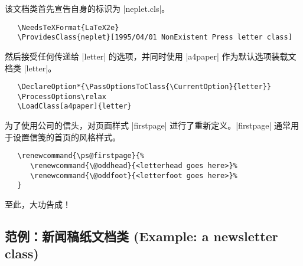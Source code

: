 \documentclass{ltxguide}[1995/11/28]
\begin{document}
该文档类首先宣告自身的标识为 |neplet.cls|。
\begin{verbatim}
   \NeedsTeXFormat{LaTeX2e}
   \ProvidesClass{neplet}[1995/04/01 NonExistent Press letter class]
\end{verbatim}
然后接受任何传递给 |letter| 的选项，并同时使用 |a4paper| 作为默认选项装载文档类 |letter|。
\begin{verbatim}
   \DeclareOption*{\PassOptionsToClass{\CurrentOption}{letter}}
   \ProcessOptions\relax
   \LoadClass[a4paper]{letter}
\end{verbatim}
为了使用公司的信头，对页面样式 |firstpage| 进行了重新定义。|firstpage| 通常用于设置信笺的首页的风格样式。
\begin{verbatim}
   \renewcommand{\ps@firstpage}{%
      \renewcommand{\@oddhead}{<letterhead goes here>}%
      \renewcommand{\@oddfoot}{<letterfoot goes here>}%
   }
\end{verbatim}
至此，大功告成！

\subsection{范例：新闻稿纸文档类 (Example: a newsletter class)}
\end{document}
